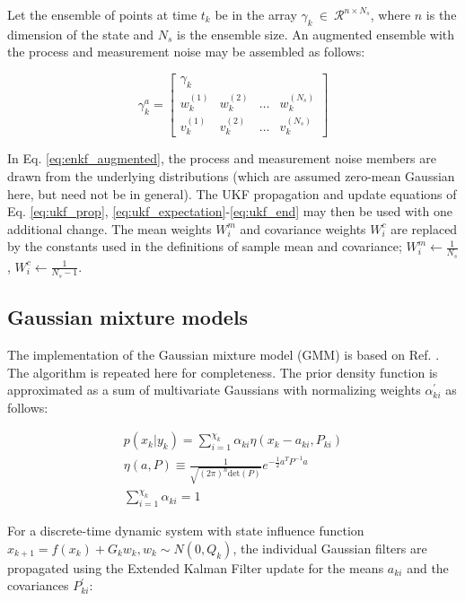 \documentclass[]{article}
\begin{document}
Let the ensemble of points at time $t_k$ be in the array $\gamma_k \ \in \ \mathcal{R}^{n \times N_s}$, where $n$ is the dimension of the state and $N_s$ is the ensemble size. An augmented ensemble with the process and measurement noise may be assembled as follows:

\begin{equation}
\gamma^a_k = \begin{bmatrix}
\gamma_k \\
w^{(1)}_k & w^{(2)}_k & \dots & w^{(N_s)}_k \\
v^{(1)}_k & v^{(2)}_k & \dots & v^{(N_s)}_k
\end{bmatrix}
\label{eq:enkf_augmented}
\end{equation}

In Eq. \ref{eq:enkf_augmented}, the process and measurement noise members are drawn from the underlying distributions (which are assumed zero-mean Gaussian here, but need not be in general). The UKF propagation and update equations of Eq. \ref{eq:ukf_prop}, \ref{eq:ukf_expectation}-\ref{eq:ukf_end} may then be used with one additional change. The mean weights $W^m_i$ and covariance weights $W^c_i$ are replaced by the constants used in the definitions of sample mean and covariance; $W^m_i \leftarrow \frac{1}{N_s}$, $W^c_i \leftarrow \frac{1}{N_s-1}$.

\subsection{Gaussian mixture models}

The implementation of the Gaussian mixture model (GMM) is based on Ref. \cite{alspach}. The algorithm is repeated here for completeness. The prior density function is approximated as a sum of multivariate Gaussians with normalizing weights $\alpha_{ki}^{'}$ as follows:

\begin{align}
	p(x_k | y_k) = \sum_{i=1}^{\chi_k} \alpha_{ki} \eta(x_k-a_{ki},P_{ki}) \\
	\eta(a,P) \equiv \frac{1}{\sqrt{(2\pi)^n \mathrm{det}(P)}} e^{-\frac{1}{2} a^T P^{-1} a} \\
	\sum_{i=1}^{\chi_k} \alpha_{ki} = 1
\end{align}

For a discrete-time dynamic system with state influence function $x_{k+1} = f(x_k) + G_k w_k,w_k \sim N(0,Q_k)$, the individual Gaussian filters are propagated using the Extended Kalman Filter update for the means $a_{ki}$ and the covariances $P_{ki}^{'}$:
\end{document}
